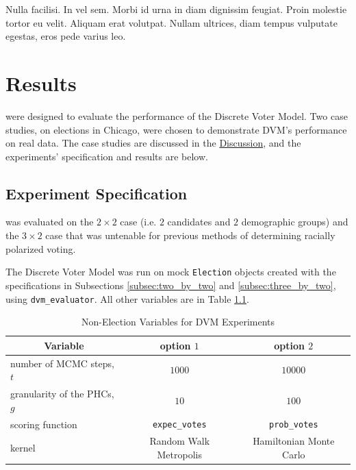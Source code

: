\begin{savequote}[75mm]
Nulla facilisi. In vel sem. Morbi id urna in diam dignissim feugiat. Proin molestie tortor eu velit. Aliquam erat volutpat. Nullam ultrices, diam tempus vulputate egestas, eros pede varius leo.
\end{savequote}

\chapter{Results}
\label{chap:results}

 were designed to evaluate the performance of the Discrete Voter Model. Two case studies, on elections in Chicago, were chosen to demonstrate DVM's performance on real data. The case studies are discussed in the \hyperref[chap:discussion]{Discussion}, and the experiments' specification and results are below.

\section{Experiment Specification}
\label{sec:exper_spec}

 was evaluated on the $2 \times 2$ case (i.e. $2$ candidates and $2$ demographic groups) and the $3 \times 2$ case that was untenable for previous methods of determining racially polarized voting.

The Discrete Voter Model was run on mock \texttt{Election} objects created with the specifications in Subsections \ref{subsec:two_by_two} and \ref{subsec:three_by_two}, using \texttt{dvm\_evaluator}. All other variables are in Table \ref{table:dvm_vars}.

\begin{table}[ht]
 \centering
 \caption{Non-Election Variables for DVM Experiments}
 \label{table:dvm_vars}
 \begin{tabular}{|l|c|c|}
   \hline
   \multicolumn{1}{|c}{Variable} & \multicolumn{1}{|c|}{option $1$}& \multicolumn{1}{c|}{option $2$} \\
   \hline
   number of MCMC steps, $t$ & $1000$ & $10000$ \\
   granularity of the PHCs, $g$ & $10$ & $100$ \\
   scoring function & \texttt{expec\_votes} & \texttt{prob\_votes} \\
   kernel & Random Walk Metropolis & Hamiltonian Monte Carlo \\
  \hline
 \end{tabular}
\end{table}

